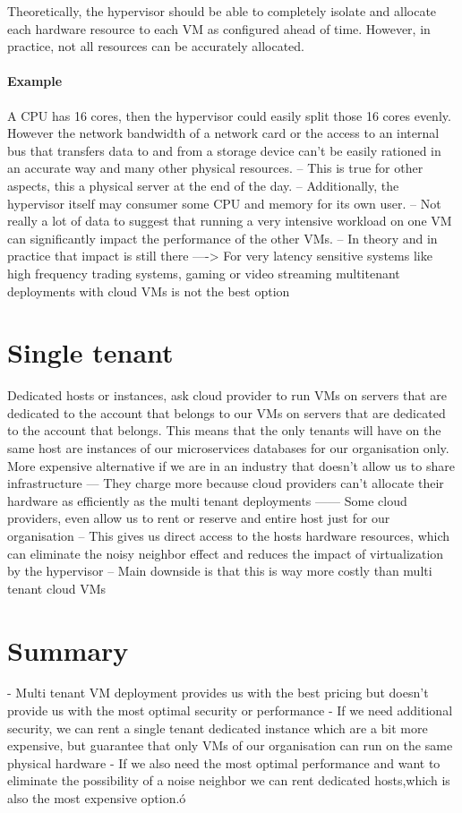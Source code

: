 \documentclass[a4paper, 11pt]{book}
\begin{document}
    Theoretically, the hypervisor should be able to completely isolate and allocate each hardware resource to each VM as configured ahead of time.
    However, in practice, not all resources can be accurately allocated.

    \paragraph{Example}
    A CPU has 16 cores, then the hypervisor could easily split those 16 cores evenly.
    However the network bandwidth of a network card or the access to an internal bus that transfers data to and from a storage device can't be easily rationed in an accurate way and many other physical resources.
    -- This is true for other aspects, this a physical server at the end of the day.
    -- Additionally, the hypervisor itself may consumer some CPU and memory for its own user.
    -- Not really a lot of data to suggest that running a very intensive workload on one VM can significantly impact the performance of the other VMs.
    -- In theory and in practice that impact is still there
    ----> For very latency sensitive systems like high frequency trading systems, gaming or video streaming multitenant deployments with cloud VMs is not the best option

    \section{Single tenant}
    Dedicated hosts or instances, ask cloud provider to run VMs on servers that are dedicated to the account that belongs to our VMs on servers that are dedicated to the account that belongs.
    This means that the only tenants will have on the same host are instances of our microservices databases for our organisation only.
    More expensive alternative if we are in an industry that doesn't allow us to share infrastructure
    --- They charge more because cloud providers can't allocate their hardware as efficiently as the multi tenant deployments
    ------ Some cloud providers, even allow us to rent or reserve and entire host just for our organisation
    -- This gives us direct access to the hosts hardware resources, which can eliminate the noisy neighbor effect and reduces the impact of virtualization by the hypervisor
    -- Main downside is that this is way more costly than multi tenant cloud VMs

    \section{Summary}
    - Multi tenant VM deployment provides us with the best pricing but doesn't provide us with the most optimal security or performance
    - If we need additional security, we can rent a single tenant dedicated instance which are a bit more expensive, but guarantee that only VMs of our organisation can run on the same physical hardware
    - If we also need the most optimal performance and want to eliminate the possibility of a noise neighbor we can rent dedicated hosts,which is also the most expensive option.ó
\end{document}
